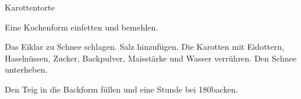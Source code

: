 \begin{recipe}{Karottentorte}
%
%
%
%
%

\begin{ingredients}
\end{ingredients}

\begin{instructions}
    Eine Kuchenform einfetten und bemehlen.

    Das Eiklar zu Schnee schlagen.
    Salz hinzufügen.
    Die Karotten mit Eidottern, Haselnüssen, Zucker, Backpulver, Maisstärke und Wasser verrühren.
    Den Schnee unterheben.

    Den Teig in die Backform füllen und eine Stunde bei 180\degC backen.
\end{instructions}
\end{recipe}
